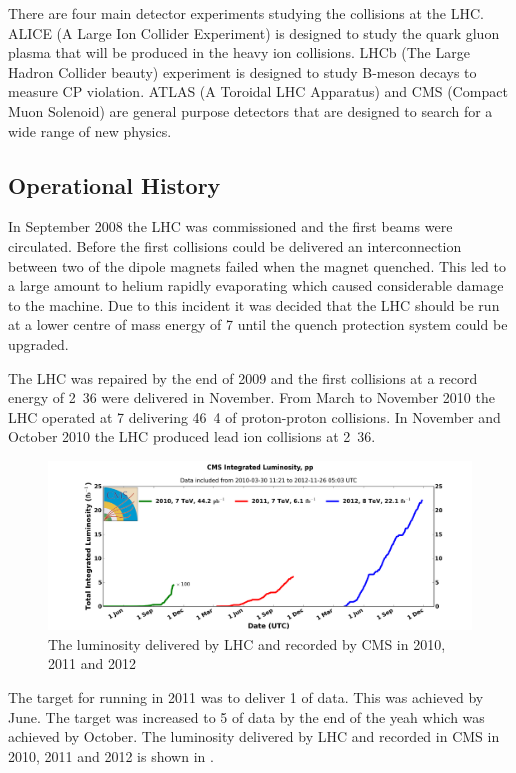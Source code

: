 There are four main detector experiments studying the collisions at the LHC. 
ALICE (A Large Ion Collider Experiment) is designed to study the quark gluon
plasma that will be produced in the heavy ion collisions. 
LHCb (The Large Hadron Collider beauty) experiment is designed to study B-meson
decays to measure CP violation. 
ATLAS (A Toroidal LHC Apparatus) and CMS (Compact Muon Solenoid) are general
purpose detectors that are designed 
to search for a wide range of new physics.\cite{lhc}

\subsection{Operational History}
In September 2008 the LHC was commissioned and the first beams were circulated.
Before the first collisions could be delivered an interconnection
between two of the dipole magnets failed when the magnet quenched.
This led to a large amount to helium rapidly evaporating which caused
considerable damage to the machine.
Due to this incident it was decided that the LHC should be run at a lower centre
of mass energy of \unit{7}{\TeV} until the quench protection system could be
upgraded.

The LHC was repaired by the end of 2009 and the first collisions at a record
energy of \unit{2.36}{\TeV} were delivered in November. 
From March to November 2010 the LHC operated at \unit{7}{\TeV} delivering
\unit{46.4}{\invpb} of proton-proton collisions.
In November and October 2010 the LHC produced lead ion collisions at
\unit{2.36}{\TeV}.

\begin{figure}[htbp]
  \centering
  \includegraphics[width=\textwidth]{int_lumi_cumulative_pp_1.png}
  \caption{The luminosity delivered by LHC and recorded by CMS in 2010, 2011 and 2012}
  \label{fig:LHC2010}
\end{figure}


The target for running in 2011 was to deliver \unit{1}{\invfb} of data. This was
achieved by June. The target was increased to \unit{5}{\invfb} of data by the end
of the yeah which was achieved by October.
The luminosity delivered by LHC and recorded in CMS in 2010, 2011 and 2012 is
shown in .

